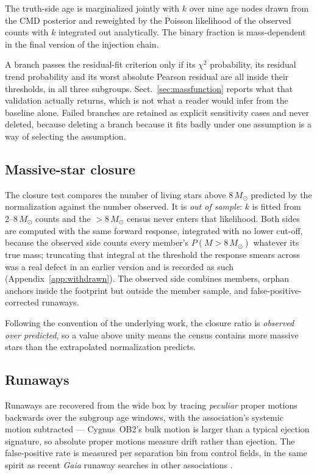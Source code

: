 \documentclass{aa}
\begin{document}
The truth-side age is marginalized jointly with $k$ over nine age nodes drawn
from the CMD posterior and reweighted by the Poisson likelihood of the observed
counts with $k$ integrated out analytically. The binary fraction is
mass-dependent in the final version of the injection chain.

A branch passes the residual-fit criterion only if its $\chi^2$ probability, its residual
trend probability and its worst absolute Pearson residual are all inside their
thresholds, in all three subgroups. Sect.~\ref{sec:massfunction} reports what
that validation actually returns, which is not what a reader would infer from the
baseline alone. Failed branches are retained as explicit sensitivity cases and
never deleted, because deleting a branch because it fits badly under one
assumption is a way of selecting the assumption.

\subsection{Massive-star closure}\label{sec:closure}

The closure test compares the number of living stars above 8\,$M_\odot$
predicted by the normalization against the number observed. It is
\emph{out of sample}: $k$ is fitted from 2--8\,$M_\odot$ counts and the
$>8\,M_\odot$ census never enters that likelihood. Both sides are computed with
the same forward response, integrated with no lower cut-off, because the
observed side counts every member's $P(M > 8\,M_\odot)$ whatever its true mass;
truncating that integral at the threshold the response smears across was a real
defect in an earlier version and is recorded as such
(Appendix~\ref{app:withdrawn}). The observed side combines members, orphan
anchors inside the footprint but outside the member sample, and
false-positive-corrected runaways.

Following the convention of the underlying work, the closure ratio is
\emph{observed over predicted}, so a value above unity means the census contains
more massive stars than the extrapolated normalization predicts.

\subsection{Runaways}\label{sec:runaways}

Runaways are recovered from the wide box by tracing \emph{peculiar} proper
motions backwards over the subgroup age windows, with the association's systemic
motion subtracted --- Cygnus~OB2's bulk motion is larger than a typical ejection
signature, so absolute proper motions measure drift rather than ejection. The
false-positive rate is measured per separation bin from control fields, in the
same spirit as recent \textit{Gaia} runaway searches in other associations
\citep{velob1runaways2026}.
\end{document}
